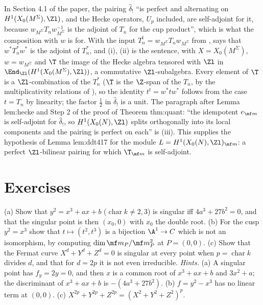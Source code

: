 \begin{paperlink}\label{pl:curves:hecke}
In Section 4.1 of the paper, the pairing $\hat\delta_!$ ``is perfect and alternating on $H^1(X_0(M^\Sigma),\Zl)$, and the Hecke operators, $U_p$ included, are self-adjoint for it, because
$w_{M^\Sigma}T_nw_{M^\Sigma}^{-1}$ is the adjoint of $T_n$ for the cup product'', which is what the composition with $w$ is for. With the input
$T_n^t=w_{M^\Sigma}T_nw_{M^\Sigma}$ from
,  says that $w^*T_n^*w^*$ is the adjoint of $T_n^*$, and (i), (ii) is the sentence, with $X=X_0(M^\Sigma)$,
$w=w_{M^\Sigma}$ and $\T$ the image of the Hecke algebra tensored with $\Zl$ in $\End_{\Zl}(H^1(X_0(M^\Sigma),\Zl))$, a commutative $\Zl$-subalgebra. Every element of
$\T$ is a $\Zl$-combination of the $T_n^*$ ($\T$ is the $\Z$-span of the $T_n$, by the multiplicativity relations of ), so the identity $t^t=w^*tw^*$
follows from the case $t=T_n$ by linearity; the factor $\frac12$ in $\hat\delta_!$ is a unit. The paragraph after Lemma lem:hecke and Step 2 of the proof of Theorem thm:quant:
``the idempotent $e_{\mf m}$ is self-adjoint for $\hat\delta_!$, so $H^1(X_0(N),\Zl)$ splits orthogonally into its local components and the pairing is perfect on each'' is
(iii). This supplies the hypothesis of Lemma lem:ddt417 for the module $L=H^1(X_0(N),\Zl)_{\mf m}$:
a perfect $\Zl$-bilinear pairing for which $\T_{\mf m}$ is self-adjoint.
\end{paperlink}

\section{Exercises}\label{sec:curves:exercises}

\begin{exercise}\label{ex:curves:ex-singular}
(a) Show that $y^2=x^3+ax+b$ ($\operatorname{char}k\ne2,3$) is singular iff $4a^3+27b^2=0$, and that the singular point is then $(x_0,0)$ with $x_0$ the double root. (b) For the cusp
$y^2=x^3$ show that $t\mapsto(t^2,t^3)$ is a bijection $\A^1\to C$ which is not an isomorphism, by computing $\dim\mf m_P/\mf m_P^2$ at $P=(0,0)$. (c) Show that the Fermat curve
$X^d+Y^d+Z^d=0$ is singular at every point when $p=\operatorname{char}k$ divides $d$, and that for $d=2p$ it is not even irreducible.
\emph{Hints.} (a) A singular point has $f_y=2y=0$, and then $x$ is a common root of $x^3+ax+b$ and $3x^2+a$; the discriminant of $x^3+ax+b$ is $-(4a^3+27b^2)$.
(b) $f=y^2-x^3$ has no linear term at $(0,0)$. (c) $X^{2p}+Y^{2p}+Z^{2p}=(X^2+Y^2+Z^2)^p$.
\end{exercise}

